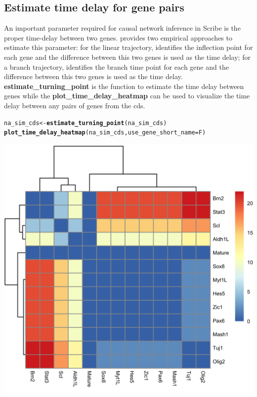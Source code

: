 \documentclass[10pt,oneside]{article}\usepackage[]{graphicx}\usepackage[]{color}
\makeatletter
\def\maxwidth{ %
  \ifdim\Gin@nat@width>\linewidth
    \linewidth
  \else
    \Gin@nat@width
  \fi
}
\newcommand{\hlstd}[1]{\textcolor[rgb]{0.345,0.345,0.345}{#1}}%
\newcommand{\hlkwb}[1]{\textcolor[rgb]{0.69,0.353,0.396}{#1}}%
\newcommand{\hlkwc}[1]{\textcolor[rgb]{0.333,0.667,0.333}{#1}}%
\newcommand{\hlkwd}[1]{\textcolor[rgb]{0.737,0.353,0.396}{\textbf{#1}}}%
\newenvironment{kframe}{%
 \def\at@end@of@kframe{}%
 \ifinner\ifhmode%
  \def\at@end@of@kframe{\end{minipage}}%
  \begin{minipage}{\columnwidth}%
 \fi\fi%
 \def\FrameCommand##1{\hskip\@totalleftmargin \hskip-\fboxsep
 \colorbox{shadecolor}{##1}\hskip-\fboxsep
     \hskip-\linewidth \hskip-\@totalleftmargin \hskip\columnwidth}%
 \MakeFramed {\advance\hsize-\width
   \@totalleftmargin\z@ \linewidth\hsize
   \@setminipage}}%
 {\par\unskip\endMakeFramed%
 \at@end@of@kframe}
\newenvironment{knitrout}{}{} %
\makeatother
\begin{document}
\subsection{Estimate time delay for gene pairs}

An important parameter required for causal network inference in Scribe is the proper time-delay between two genes.  provides two empirical approaches to estimate this parameter: for the linear trajectory,  identifies the inflection point for each gene and the difference between this two genes is used as the time delay; for a branch trajectory,  identifies the branch time point for each gene and the difference between this two genes is used as the time delay. \textbf{estimate\_turning\_point} is the function to estimate the time delay between genes while the \textbf{plot\_time\_delay\_heatmap} can be used to visualize the time delay between any pairs of genes from the cds.

\begin{knitrout}
\color{fgcolor}\begin{kframe}
\begin{alltt}
\hlstd{na_sim_cds} \hlkwb{<-} \hlkwd{estimate_turning_point}\hlstd{(na_sim_cds)}
\hlkwd{plot_time_delay_heatmap}\hlstd{(na_sim_cds,} \hlkwc{use_gene_short_name} \hlstd{= F)}
\end{alltt}


{\ttfamily\noindent\itshape\color{messagecolor}{\#\# There is NA values in turining points calculated, the time delay is set to 0 by default}}\end{kframe}

{\centering \includegraphics[width=\maxwidth]{figure/plot_time_delay_heatmap-1} 

}



\end{knitrout}
\end{document}
